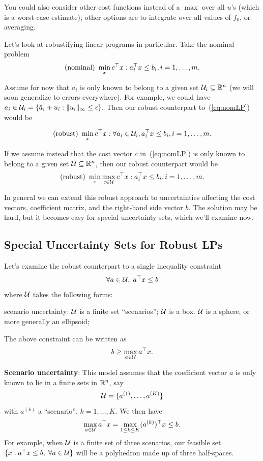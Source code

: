 \documentclass[11 pt]{scrartcl}
\begin{document}
You could also consider other cost functions instead of a $\max$ over all $u$'s (which is a worst-case estimate); other options are to integrate over all values of $f_0$, or averaging. 

Let's look at robustifying linear programs in particular. 
Take the nominal problem 
\begin{align}
\text{(nominal) }\min_x c^\top x : a_i^\top x \leq b_i, i = 1, \dots, m.
\label{eq:nomLP}
\end{align}

Assume for now that $a_i$ is only known to belong to a given set $\mathcal U_i \subseteq \mathbb R^n$ (we will soon generalize to errors everywhere). 
For example, we could have $a_i \in \mathcal U_i = \{\hat{a}_i + u_i : \|u_i\|_\infty \leq \epsilon\}.$
Then our robust counterpart to~(\ref{eq:nomLP}) would be 

\[ \text{(robust) }\min_x c^\top x : \forall a_i\in \mathcal U_i, a_i^\top x \leq b_i, i = 1,\dots, m.\] 

If we assume instead that the cost vector $c$ in~(\ref{eq:nomLP}) is only known to belong to a given set $\mathcal U \subseteq \mathbb R^n$, then our robust counterpart would be 
\[ \text{(robust) }\min_x \max_{c\in\mathcal U} c^\top x : a_i^\top x \leq b_i, i = 1,\dots, m.\] 

In general we can extend this robust approach to uncertainties affecting the cost vectors, coefficient matrix, and the right-hand side vector $b$. 
The solution may be hard, but it becomes easy for special uncertainty sets, which we'll examine now. 

\subsection{Special Uncertainty Sets for Robust LPs}
Let's examine the robust counterpart to a single inequality constraint 
\[ \forall a\in \mathcal U,\; a^\top x \leq b\]
where $\mathcal U$ takes the following forms: 
\begin{itemize}
    \ii scenario uncertainty: $\mathcal U$ is a finite set ``scenarios''; 
    \ii $\mathcal U$ is a box.
    \ii $\mathcal U$ is a sphere, or more generally an ellipsoid; 
\end{itemize}

The above constraint can be written as 
\[ b \geq \max_{a\in \mathcal U} a^\top x.\] 

\begin{itemize}
    \ii \textbf{Scenario uncertainty}: This model assumes that the coefficient vector $a$ is only known to lie in a finite sets in $\mathbb R^n$, say 
    \[ \mathcal U = \{a^{(1)}, \dots, a^{(K)}\}\]
    with $a^{(k)}$ a ``scenario'', $k = 1,\dots, K$. 
    We then have 
    \[ \max_{a\in \mathcal U} a^\top x = \max_{1\leq k \leq K} (a^{(k)})^\top x \leq b.\] 
    For example, when $\mathcal U$ is a finite set of three scenarios, our feasible set $\{x: a^\top x \leq b,\; \forall a\in \mathcal U\}$ will be a polyhedron made up of three half-spaces. 
\end{itemize}
\end{document}

